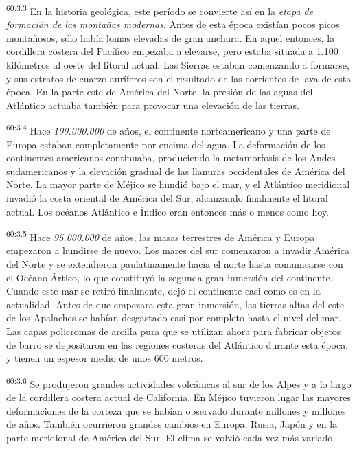 \par
\textsuperscript{60:3.3} En la historia geológica, este período se convierte así en la \textit{etapa de formación de las montañas modernas}. Antes de esta época existían pocos picos montañosos, sólo había lomas elevadas de gran anchura. En aquel entonces, la cordillera costera del Pacífico empezaba a elevarse, pero estaba situada a 1.100 kilómetros al oeste del litoral actual. Las Sierras estaban comenzando a formarse, y sus estratos de cuarzo auríferos son el resultado de las corrientes de lava de esta época. En la parte este de América del Norte, la presión de las aguas del Atlántico actuaba también para provocar una elevación de las tierras.

\par
\textsuperscript{60:3.4} Hace \textit{100.000.000} de años, el continente norteamericano y una parte de Europa estaban completamente por encima del agua. La deformación de los continentes americanos continuaba, produciendo la metamorfosis de los Andes sudamericanos y la elevación gradual de las llanuras occidentales de América del Norte. La mayor parte de Méjico se hundió bajo el mar, y el Atlántico meridional invadió la costa oriental de América del Sur, alcanzando finalmente el litoral actual. Los océanos Atlántico e
Índico eran entonces más o menos como hoy.

\par
\textsuperscript{60:3.5} Hace \textit{95.000.000} de años, las masas terrestres de América y Europa empezaron a hundirse de nuevo. Los mares del sur comenzaron a invadir América del Norte y se extendieron paulatinamente hacia el norte hasta comunicarse con el Océano Ártico, lo que constituyó la segunda gran inmersión del continente. Cuando este mar se retiró finalmente, dejó el continente casi como es en la actualidad. Antes de que empezara esta gran inmersión, las tierras altas del este de los Apalaches se habían desgastado casi por completo hasta el nivel del mar. Las capas policromas de arcilla pura que se utilizan ahora para fabricar objetos de barro se depositaron en las regiones costeras del Atlántico durante esta época, y tienen un espesor medio de unos 600 metros.

\par
\textsuperscript{60:3.6} Se produjeron grandes actividades volcánicas al sur de los Alpes y a lo largo de la cordillera costera actual de California. En Méjico tuvieron lugar las mayores deformaciones de la corteza que se habían observado durante millones y millones de años. También ocurrieron grandes cambios en Europa, Rusia, Japón y en la parte meridional de América del Sur. El clima se volvió cada vez más variado.

